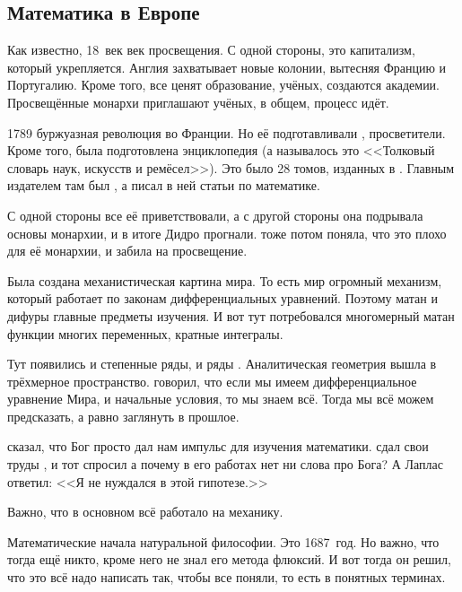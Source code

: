 \documentclass[a4paper,oneside,fleqn,10pt]{article}
\begin{document}
\subsection{Математика в Европе}

Как известно, 18~век век просвещения. С одной стороны, это капитализм,
который укрепляется.  Англия захватывает новые колонии, вытесняя
Францию и Португалию. Кроме того, все ценят образование, учёных,
создаются академии. Просвещённые монархи приглашают учёных, в общем,
процесс идёт.

1789 буржуазная революция во Франции. Но её подготавливали
,  просветители.  Кроме того, была
подготовлена энциклопедия (а называлось это <<Толковый словарь наук,
искусств и ремёсел>>).  Это было 28 томов, изданных в
. Главным издателем там был , а
 писал в ней статьи по математике.

С одной стороны все её приветствовали, а с другой стороны она
подрывала основы монархии, и в итоге Дидро прогнали.  тоже потом поняла, что это плохо для её
монархии, и забила на просвещение.

Была создана механистическая картина мира. То есть мир огромный
механизм, который работает по законам дифференциальных
уравнений. Поэтому матан и дифуры главные предметы изучения.  И вот
тут потребовался многомерный матан функции многих переменных, кратные
интегралы.

Тут появились и степенные ряды, и ряды . Аналитическая
геометрия вышла в трёхмерное пространство.   говорил, что
если мы имеем дифференциальное уравнение Мира, и начальные условия, то
мы знаем всё.  Тогда мы всё можем предсказать, а равно заглянуть в
прошлое.  

 сказал, что Бог просто дал нам импульс для изучения
математики.   сдал свои труды
, и тот спросил а почему в его работах нет
ни слова про Бога?  А Лаплас ответил: <<Я не нуждался в этой
гипотезе.>>

Важно, что в основном всё работало на механику.

 Математические начала натуральной философии. Это
1687~год.  Но важно, что тогда ещё никто, кроме него не знал его
метода флюксий.  И вот тогда он решил, что это всё надо написать так,
чтобы все поняли, то есть в понятных терминах.
\end{document}

